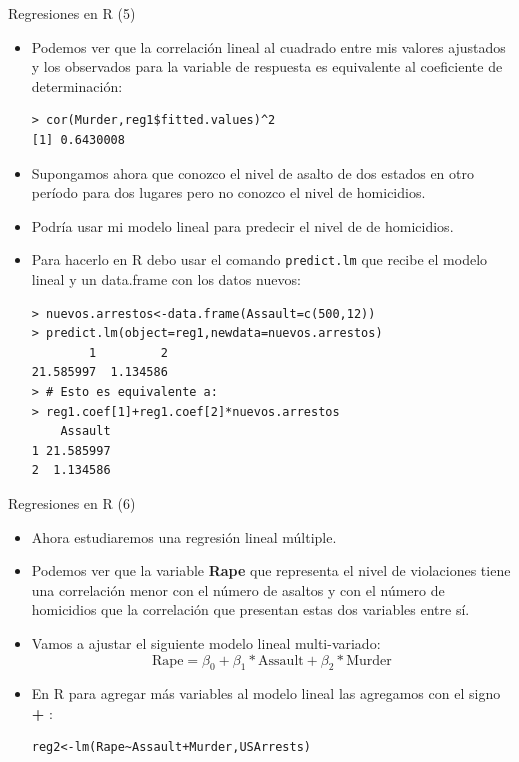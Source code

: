 \documentclass[handout]{beamer}
\begin{document}
\begin{frame}[fragile]{Regresiones en R (5)}
\scriptsize{
\begin{itemize}
 \item Podemos ver que la correlación lineal al cuadrado entre mis valores ajustados y los observados para la variable de respuesta es equivalente al coeficiente de determinación:
 
 \begin{verbatim}
> cor(Murder,reg1$fitted.values)^2
[1] 0.6430008
 \end{verbatim}

\item Supongamos ahora que conozco el nivel de asalto de dos estados en otro período para dos lugares pero no conozco el nivel de homicidios.

\item Podría usar mi modelo lineal para predecir el nivel de de homicidios.

\item Para hacerlo en R debo usar el comando \verb+predict.lm+ que recibe el modelo lineal y un data.frame con los datos nuevos:
\begin{verbatim}
> nuevos.arrestos<-data.frame(Assault=c(500,12))
> predict.lm(object=reg1,newdata=nuevos.arrestos)
        1         2 
21.585997  1.134586 
> # Esto es equivalente a:
> reg1.coef[1]+reg1.coef[2]*nuevos.arrestos
    Assault
1 21.585997
2  1.134586 
\end{verbatim}

 
 \end{itemize}
 

} 
\end{frame}


\begin{frame}[fragile]{Regresiones en R (6)}
\scriptsize{
\begin{itemize}
 \item Ahora estudiaremos una regresión lineal múltiple.
 \item Podemos ver que la variable \textbf{Rape} que representa el nivel de violaciones tiene una correlación menor con el número de asaltos y con el número de homicidios que la correlación que presentan estas dos variables entre sí.
 \item Vamos a ajustar el siguiente modelo lineal multi-variado:
 \begin{displaymath}
 \text{Rape}=\beta_{0}+\beta_{1}*\text{Assault}+\beta_{2}*\text{Murder}
 \end{displaymath}
 \item En R para agregar más variables al modelo lineal las agregamos con el signo \textbf{+} :
\begin{verbatim}
reg2<-lm(Rape~Assault+Murder,USArrests)
\end{verbatim}



 
 \end{itemize}
 

} 
\end{frame}
\end{document}
